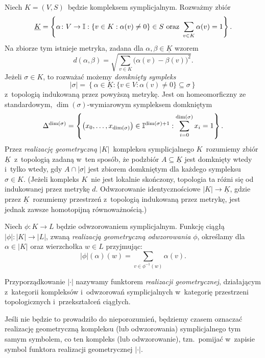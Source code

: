 Niech $K=(V,S)$~będzie kompleksem symplicjalnym. Rozważmy zbiór 
\[\underline{K}=\left\{\alpha\colon V\to \mathbb{I}: \{v\in K:\alpha(v)\not=0\}\in S \text{ oraz } \sum_{v\in K}\alpha(v)=1\right\}.\]
Na zbiorze tym istnieje metryka, zadana dla $\alpha,\beta\in \underline{K}$ wzorem \[d(\alpha,\beta)=\sqrt{\sum_{v\in K}\bigl(\alpha(v)-\beta(v)\bigr)^2}.\]
Jeżeli $\sigma\in K$, to rozważać możemy \textit{domknięty sympleks} \[|\sigma|=\left\{\alpha\in\underline{K}:\{v\in V:\alpha(v)\not=0\}\subseteq \sigma\right\}\] z~topologią indukowaną przez powyższą metrykę. Jest on homeomorficzny ze standardowym, $\dim(\sigma)$-wymiarowym sympleksem domkniętym \[\Delta^{\dim(\sigma)}=\left\{\left(x_0,\ldots,x_{\dim(\sigma)}\right)\in \mathbb{I}^{\dim(\sigma)+1}: \sum_{i=0}^{\dim(\sigma)}x_i=1\right\}.\]Przez \textit{realizację geometryczną} $|K|$~kompleksu symplicjalnego $K$~rozumiemy zbiór $\underline{K}$~z~topologią zadaną w~ten sposób, że podzbiór $A\subseteq\underline{K}$ jest domknięty wtedy i~tylko wtedy, gdy $A\cap |\sigma|$ jest zbiorem domkniętym dla każdego sympleksu $\sigma\in K$. (Jeżeli kompleks $K$~nie jest lokalnie skończony, topologia ta różni się od indukowanej przez metrykę $d$. Odwzorowanie identycznościowe $|K|\to \underline{K}$, gdzie przez $\underline{K}$~rozumiemy przestrzeń z~topologią indukowaną przez metrykę, jest jednak zawsze homotopijną równoważnością.) 

Niech $\phi\colon K\to L$ będzie odwzorowaniem symplicjalnym. Funkcję ciągłą $|\phi|\colon |K|\to |L|$, zwaną \textit{realizacją geometryczną odwzorowania} $\phi$, określamy dla $\alpha\in |K|$ oraz wierzchołka $w\in L$ przyjmując: \[|\phi|(\alpha)(w)=\sum_{v\in\phi^{-1}(w)}\alpha(v).\]

Przyporządkowanie $|\cdot|$ nazywamy funktorem \textit{realizacji geometrycznej}, działającym z~kategorii kompleksów i~odwzorowań symplicjalnych w~kategorię przestrzeni topologicznych i~przekształceń ciągłych.

Jeśli nie będzie to prowadziło do nieporozumień, będziemy czasem oznaczać realizację geometryczną kompleksu (lub odwzorowania) symplicjalnego tym samym symbolem, co ten kompleks (lub odwzorowanie), tzn.~pomijać w~zapisie symbol funktora realizacji geometrycznej $|\cdot|$.

